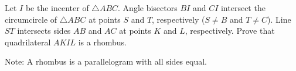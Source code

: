 Let $I$ be the incenter of $\triangle{ABC}$. Angle bisectors $BI$ and $CI$ intersect the circumcircle of $\triangle{ABC}$ at points $S$ and $T$, respectively ($S \neq B$ and $T \neq C$). Line $ST$ intersects sides $AB$ and $AC$ at points $K$ and $L$, respectively. Prove that quadrilateral $AKIL$ is a rhombus.



Note: A rhombus is a parallelogram with all sides equal.
